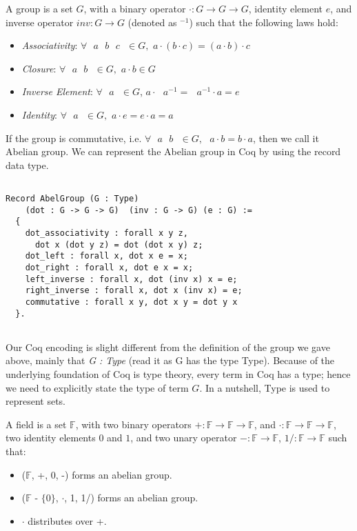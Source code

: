 \begin{definition}[Group] 
A group is a set $G$, with a binary operator $\cdot : G \rightarrow G \rightarrow G$, identity element $e$, and inverse operator $inv : G \rightarrow G$ (denoted as $^{-1}$) such 
    that the following laws hold:  \end{definition} 
    \begin{itemize}
     \item \textit{Associativity}: $\forall \text{  }a \text{  }b \text{  }c \text{  } \in G,$  $a \cdot (b \cdot c) = (a \cdot b) \cdot c$
    \item \textit{Closure}: $\forall \text{  } a \text{  } b \text{  } \in G,$  $a \cdot b \in G$
    \item \textit{Inverse Element}: $\forall \text{  } a \text{  } \in G$, $a \cdot \text{ } a^{-1} = \text{ } a^{-1} \cdot a = e$
    \item \textit{Identity}: $\forall \text{  } a \text{  } \in G,$  $a \cdot e = e \cdot a  = a$
    \end{itemize}
  
    \noindent
    If the group is commutative, i.e. $\forall \text{  } a \text{  }b \text{  }\in  G, \text{   } a \cdot b = b \cdot a$, then we call it Abelian group.  We can represent the Abelian group in Coq by using the 
    record data type. 
 
 \begin{verbatim}

Record AbelGroup (G : Type)
    (dot : G -> G -> G)  (inv : G -> G) (e : G) :=
  {
    dot_associativity : forall x y z, 
      dot x (dot y z) = dot (dot x y) z;
    dot_left : forall x, dot x e = x;
    dot_right : forall x, dot e x = x;
    left_inverse : forall x, dot (inv x) x = e;
    right_inverse : forall x, dot x (inv x) = e;
    commutative : forall x y, dot x y = dot y x
  }.
  
\end{verbatim}

\noindent
Our Coq encoding is slight different from the definition of the group we gave above, mainly that \textit{G : Type} (read it as G has the type Type). 
Because of the underlying foundation of Coq is type theory, every term in Coq has a type;
hence we need to explicitly state the type of term $G$.  In a nutshell, Type is used to represent sets.  

\begin{definition}[Field] 
A field  is a set $\mathbb{F}$, with two binary operators $+ : \mathbb{F} \rightarrow \mathbb{F} \rightarrow \mathbb{F}$,  and $\cdot : \mathbb{F} \rightarrow \mathbb{F} \rightarrow \mathbb{F}$, 
two identity elements $0$ and $1$, and two unary operator $- : \mathbb{F} \rightarrow \mathbb{F}$, $1/ : \mathbb{F} \rightarrow \mathbb{F}$  such that:
\end{definition} 
 \begin{itemize}
 \item ($\mathbb{F}$, +, 0, -) forms an abelian group.
 \item ($\mathbb{F}$ - $\lbrace 0 \rbrace$, $\cdot$, 1, 1/) forms an abelian group.
 \item $\cdot$ distributes over +.
 \end{itemize}
 
